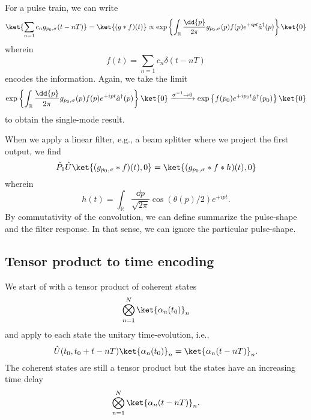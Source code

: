 For a pulse train, we can write
\begin{equation}
	\ket{\sum_{n=1}c_ng_{p_0,\sigma}(t-nT)}
	=
	\ket{(g*f)(t)}
	\propto
	\exp\left\{
		\int_\mathbb{R}
		\frac{\dd{p}}{2\pi}
		g_{p_0,\sigma}(p)
		f(p)e^{+ipt}
		\hat{a}^\dagger(p)
	\right\}
	\ket{0}
\end{equation}
wherein
\begin{equation}
	f(t)
	=
	\sum_{n=1}c_n\delta(t-nT)
\end{equation}
encodes the information.
Again, we take the limit
\begin{equation}
	\exp\left\{
		\int_\mathbb{R}
		\frac{\dd{p}}{2\pi}
		g_{p_0,\sigma}(p)
		f(p)e^{+ipt}
		\hat{a}^\dagger(p)
	\right\}
	\ket{0}
	\xrightarrow{\sigma^{-1}\to0}
	\exp\left\{
		f(p_0)
		e^{+ip_0t}
		\hat{a}^\dagger(p_0)
	\right\}
	\ket{0}	
\end{equation}
to obtain the single-mode result.

When we apply a linear filter, e.g., a beam splitter where we project the first output, we find
\begin{equation}
	\hat{P}_1\hat{U}\ket{(g_{p_0,\sigma}*f)(t),0}
	=
	\ket{(g_{p_0,\sigma}*f*h)(t),0}
\end{equation}
wherein
\begin{equation}
	h(t)
	=
	\int_\mathbb{R}
	\frac{\dd{p}}{\sqrt{2\pi}}
	\cos(\theta(p)/2)
	e^{+ipt}
	.
\end{equation}
By commutativity of the convolution, we can define summarize the pulse-shape and the filter response.
In that sense, we can ignore the particular pulse-shape.

\subsection{Tensor product to time encoding}

We start of with a tensor product of coherent states
\begin{equation}
	\bigotimes_{n=1}^N
	\ket{\alpha_n(t_0)}_n
\end{equation}
and apply to each state the unitary time-evolution, i.e.,
\begin{equation}
	\hat{U}(t_0,t_0+t-nT)
	\ket{\alpha_n(t_0)}_n
	=
	\ket{\alpha_n(t-nT)}_n
	.
\end{equation}
The coherent states are still a tensor product but the states have an increasing time delay
\begin{equation}
	\bigotimes_{n=1}^N
	\ket{\alpha_n(t-nT)}_n
	.
\end{equation}

